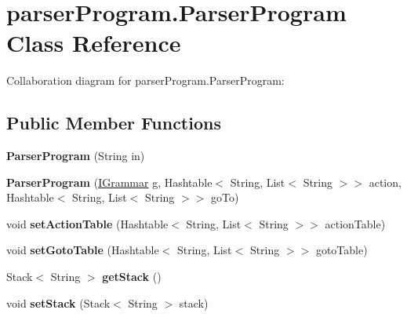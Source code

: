 \hypertarget{classparser_program_1_1_parser_program}{\section{parser\-Program.\-Parser\-Program Class Reference}
\label{classparser_program_1_1_parser_program}
}


Collaboration diagram for parser\-Program.\-Parser\-Program\-:
\subsection*{Public Member Functions}
\begin{DoxyCompactItemize}
\item 
\hypertarget{classparser_program_1_1_parser_program_a75809e27c5f5fd3b28863c17024c78a6}{{\bfseries Parser\-Program} (String in)}\label{classparser_program_1_1_parser_program_a75809e27c5f5fd3b28863c17024c78a6}

\item 
\hypertarget{classparser_program_1_1_parser_program_a00bd1a89b976e04b3e3ed022093a3664}{{\bfseries Parser\-Program} (\hyperlink{interfacecontext_free_1_1grammar_1_1_i_grammar}{I\-Grammar} g, Hashtable$<$ String, List$<$ String $>$$>$ action, Hashtable$<$ String, List$<$ String $>$$>$ go\-To)}\label{classparser_program_1_1_parser_program_a00bd1a89b976e04b3e3ed022093a3664}

\item 
\hypertarget{classparser_program_1_1_parser_program_a85c97b5518ccedd3cfeae357e8ed28e2}{void {\bfseries set\-Action\-Table} (Hashtable$<$ String, List$<$ String $>$$>$ action\-Table)}\label{classparser_program_1_1_parser_program_a85c97b5518ccedd3cfeae357e8ed28e2}

\item 
\hypertarget{classparser_program_1_1_parser_program_a157523a0c4a59471b6194e5868840b7f}{void {\bfseries set\-Goto\-Table} (Hashtable$<$ String, List$<$ String $>$$>$ goto\-Table)}\label{classparser_program_1_1_parser_program_a157523a0c4a59471b6194e5868840b7f}

\item 
\hypertarget{classparser_program_1_1_parser_program_a89685a1ddaa7fe03516ab89efeffa1bf}{Stack$<$ String $>$ {\bfseries get\-Stack} ()}\label{classparser_program_1_1_parser_program_a89685a1ddaa7fe03516ab89efeffa1bf}

\item 
\hypertarget{classparser_program_1_1_parser_program_aeae5ec3cce4e823ada43a40403a84edd}{void {\bfseries set\-Stack} (Stack$<$ String $>$ stack)}\label{classparser_program_1_1_parser_program_aeae5ec3cce4e823ada43a40403a84edd}


\end{DoxyCompactItemize}
